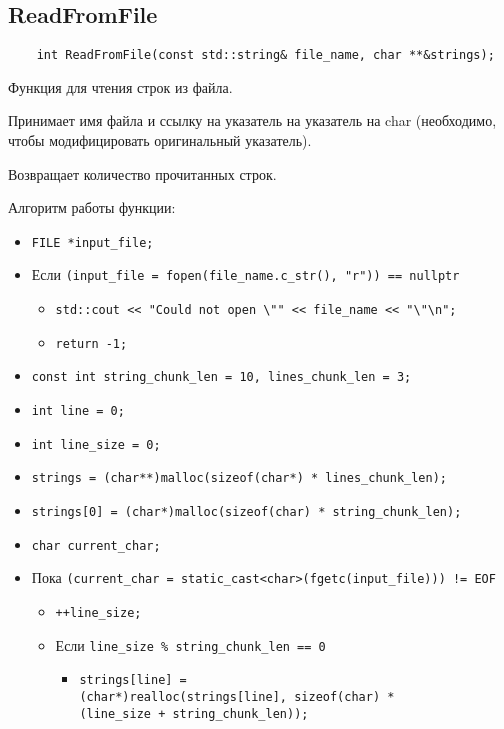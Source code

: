 \subsection*{ReadFromFile}

\begin{lstlisting}
	int ReadFromFile(const std::string& file_name, char **&strings);
\end{lstlisting}

Функция для чтения строк из файла. 

Принимает имя файла и 
ссылку на указатель на указатель на char 
(необходимо, чтобы модифицировать оригинальный указатель). 

Возвращает количество прочитанных строк.

Алгоритм работы функции:

\begin{itemize}
    \item \verb|FILE *input_file;|
	\item Если \verb|(input_file = fopen(file_name.c_str(), "r")) == nullptr|
		\begin{itemize}
			\item \verb|std::cout << "Could not open \"" << file_name << "\"\n";|
			\item \verb|return -1;|
		\end{itemize}
    \item \verb|const int string_chunk_len = 10, lines_chunk_len = 3;|
    \item \verb|int line = 0;|
    \item \verb|int line_size = 0;|
    \item \verb|strings = (char**)malloc(sizeof(char*) * lines_chunk_len);|
    \item \verb|strings[0] = (char*)malloc(sizeof(char) * string_chunk_len);|
    \item \verb|char current_char;|
	\item Пока \verb|(current_char = static_cast<char>(fgetc(input_file))) != EOF|
		\begin{itemize}
			\item \verb|++line_size;|
			\item Если \verb|line_size % string_chunk_len == 0|
				\begin{itemize}
					\item \verb|strings[line] = |\\
					\verb|(char*)realloc(strings[line], sizeof(char) *|\\
					\verb|(line_size + string_chunk_len));|

\end{itemize}
\end{itemize}
\end{itemize}
